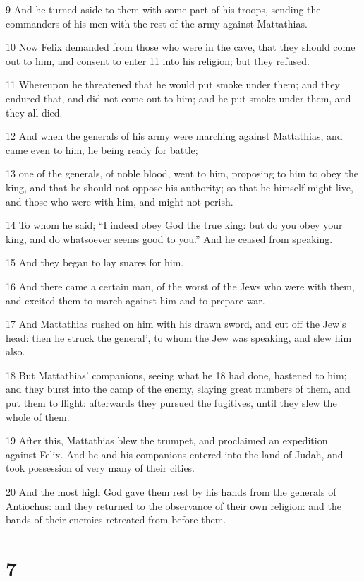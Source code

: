 9 And he turned aside to them with some part of his troops, sending the commanders of his men with the rest of the army against Mattathias. 

10 Now Felix demanded from those who were in the cave, that they should come out to him, and consent to enter 11 into his religion; but they refused. 

11 Whereupon he threatened that he would put smoke under them; and they endured that, and did not come out to him; and he put smoke under them, and they all died.

12 And when the generals of his army were marching against Mattathias, and came even to him, he being ready for battle; 

13 one of the generals, of noble blood, went to him, proposing to him to obey the king, and that he should not oppose his authority; so that he himself might live, and those who were with him, and might not perish. 

14 To whom he said; “I indeed obey God the true king: but do you obey your king, and do whatsoever seems good to you.” And he ceased from speaking. 

15 And they began to lay snares for him. 

16 And there came a certain man, of the worst of the Jews who were with them, and excited them to march against him and to prepare war. 

17 And Mattathias rushed on him with his drawn sword, and cut off the Jew’s head: then he struck the general’, to whom the Jew was speaking, and slew him also. 

18 But Mattathias’ companions, seeing what he 18 had done, hastened to him; and they burst into the camp of the enemy, slaying great numbers of them, and put them to flight: afterwards they pursued the fugitives, until they slew the whole of them. 

19 After this, Mattathias blew the trumpet, and proclaimed an expedition against Felix. And he and his companions entered into the land of Judah, and took possession of very many of their cities. 

20 And the most high God gave them rest by his hands from the generals of Antiochus: and they returned to the observance of their own religion: and the bands of their enemies retreated from before them. 

\chapter{7}

